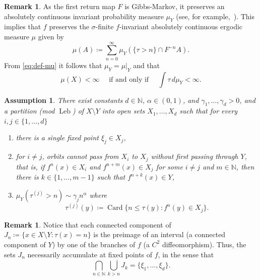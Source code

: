 \documentclass[english, 10pt]{amsart}
\numberwithin{equation}{section}
\theoremstyle{definition}
\theoremstyle{plain}
\newtheorem{assumption}{Assumption}
\theoremstyle{plain}
\theoremstyle{definition}
\newtheorem{remark}[definition]{Remark}
\theoremstyle{definition}
\theoremstyle{plain}
\theoremstyle{definition}
\newcommand{\Leb}{\operatorname{Leb}}
\newcommand{\Card}{\operatorname{Card}}
\newcommand{\N}{{\mathbb N}}
\newcommand{\eqdef}{\coloneqq}
\newcommand{\bN}{\N}
\numberwithin{equation}{section}
\begin{document}
\begin{remark}
  As the first return map $F$ is Gibbs-Markov, it preserves an absolutely continuous invariant probability measure $\mu_Y$  (see, for example,~\cite[Chapter 4]{Aar:1997}). This implies that $f$ preserves the  $\sigma$-finite $f$-invariant absolutely continuous ergodic measure $\mu$ given by
  \begin{equation}\label{eq:def-mu}
    \mu ( A ) \eqdef \sum_{ n = 0 }^{ \infty }  \mu_Y ( \{  \tau > n \} \cap F^{-n} A )
    .
  \end{equation}
  From \eqref{eq:def-mu} it follows that $\mu_Y = \mu|_{Y}$ and that
  \[
  \mu ( X ) < \infty\quad \text{ if and only if }\quad \int \tau \, d\mu_Y < \infty.
  \]
\end{remark}

\begin{assumption}\label{asm:dyn-sep}
  There exist constants $d \in\bN$, $\alpha \in (0,1)$, and $\gamma_1, \ldots, \gamma_d>0$, and a partition (mod $\Leb$) of $X \setminus Y$ into open sets $X_1,\ldots,X_d$ such that for every $i,j\in\{1,\ldots,d\}$
\begin{enumerate}[leftmargin=0.6cm ]
\item there is a single fixed point $\xi_j \in X_j$,
\item\label{itm:dyn-sep} for $i \neq j$, orbits cannot pass from $X_i$ to $X_j$ without first passing through $Y$, that is, if $f^{ n } (x) \in X_{ i }$ and $f^{ n + m }(x) \in X_{ j }$ for some $i \neq j$ and $m\in\bN$, then there is $k \in\{1,\ldots,m-1\}$ such that $f^{ n+k }( x) \in Y$,
\item\label{itm:reg-var} $\mu_Y ( \tau^{(j)} > n ) \sim \gamma_j n^{\alpha}$ where 
\[
    	\tau^{(j)}(y) \eqdef \Card \big\{ n \le \tau (y) \colon f^n (y) \in X_j\big\}.
\]	
\end{enumerate}
\end{assumption}


\begin{remark}\label{rem:accum}
  Notice that each connected component of $J_n \eqdef \{ x \in X \setminus Y \colon \tau(x) = n \}$   is the preimage of an interval (a connected component of $Y$) by one of the branches of $f$ (a $C^2$ diffeomorphism). Thus, the sets $J_n$ necessarily accumulate at fixed points of $f$, in the sense that 
  \[
    \bigcap_{ n\in\bN } \overline{ \bigcup_{ k > n }  J_k }
    = \{ \xi_1, \ldots, \xi_d \}.
  \]
\end{remark}
\end{document}
